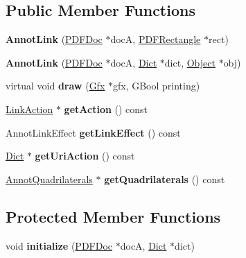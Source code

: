 \subsection*{Public Member Functions}
\begin{DoxyCompactItemize}
\item 
\mbox{\label{class_annot_link_a8a0720d7b9dc8b5f5c2a24e21f12e375}} 
{\bfseries Annot\+Link} (\hyperlink{class_p_d_f_doc}{P\+D\+F\+Doc} $\ast$docA, \hyperlink{class_p_d_f_rectangle}{P\+D\+F\+Rectangle} $\ast$rect)
\item 
\mbox{\label{class_annot_link_a2076c66ba327d91a3185ac1faae9750a}} 
{\bfseries Annot\+Link} (\hyperlink{class_p_d_f_doc}{P\+D\+F\+Doc} $\ast$docA, \hyperlink{class_dict}{Dict} $\ast$dict, \hyperlink{class_object}{Object} $\ast$obj)
\item 
\mbox{\label{class_annot_link_aa7d81ebb888924e0d91107272afb7f1c}} 
virtual void {\bfseries draw} (\hyperlink{class_gfx}{Gfx} $\ast$gfx, G\+Bool printing)
\item 
\mbox{\label{class_annot_link_a3e645126c21d9947685e5897dafcd912}} 
\hyperlink{class_link_action}{Link\+Action} $\ast$ {\bfseries get\+Action} () const
\item 
\mbox{\label{class_annot_link_ac5504e1d3fbc736cb474b783291aa11b}} 
Annot\+Link\+Effect {\bfseries get\+Link\+Effect} () const
\item 
\mbox{\label{class_annot_link_a188daaaa6726916e06c544b5394d6a71}} 
\hyperlink{class_dict}{Dict} $\ast$ {\bfseries get\+Uri\+Action} () const
\item 
\mbox{\label{class_annot_link_a9e65d605744a6a42bc5174292857a8c7}} 
\hyperlink{class_annot_quadrilaterals}{Annot\+Quadrilaterals} $\ast$ {\bfseries get\+Quadrilaterals} () const
\end{DoxyCompactItemize}
\subsection*{Protected Member Functions}
\begin{DoxyCompactItemize}
\item 
\mbox{\label{class_annot_link_a3387cbfd35d9acaba71a5ab509794561}} 
void {\bfseries initialize} (\hyperlink{class_p_d_f_doc}{P\+D\+F\+Doc} $\ast$docA, \hyperlink{class_dict}{Dict} $\ast$dict)
\end{DoxyCompactItemize}
